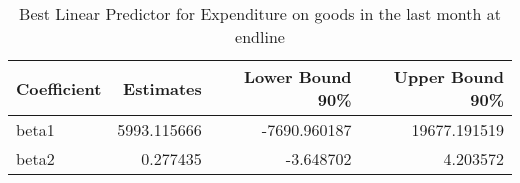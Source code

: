 \begin{table}

\caption{\label{tab:blpQExpenditure_totDF}Best Linear Predictor for Expenditure on goods in the last month at endline}
\centering
\begin{tabular}[t]{lrrr}
\toprule
Coefficient & Estimates & Lower Bound 90\% & Upper Bound 90\%\\
\midrule
beta1 & 5993.115666 & -7690.960187 & 19677.191519\\
beta2 & 0.277435 & -3.648702 & 4.203572\\
\bottomrule
\end{tabular}
\end{table}
